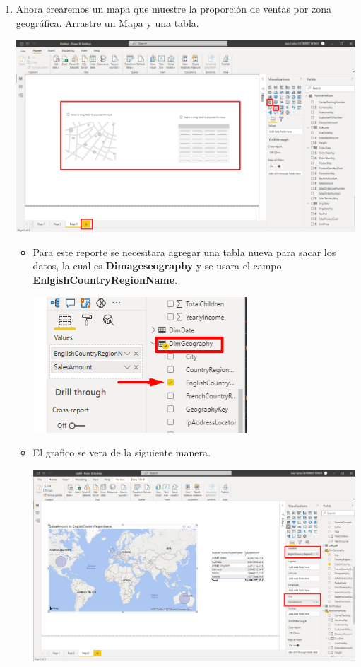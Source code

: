 \documentclass{article}
\begin{document}
\begin{enumerate}[\tab 1.]
\begin{center}
        \end{center}
        \item Ahora crearemos un mapa que muestre la proporción de ventas por zona geográfica. Arrastre un Mapa y una tabla.
        \begin{center}
            \includegraphics[width=13cm]{./images/10.png}
        \end{center}
        \begin{itemize}
        \newpage
            \item Para este reporte se necesitara agregar una tabla nueva para sacar los datos, la cual es \textbf{Dimageseography} y se usara el campo \textbf{EnlgishCountryRegionName}. 
            \begin{center}
                \includegraphics[width=8cm]{./images/10.1.png}
            \end{center}
            \item El grafico se vera de la siguiente manera.
            \begin{center}
                \includegraphics[width=13cm]{./images/10.2.png}
            \end{center}
            

\end{itemize}
\end{enumerate}
\end{document}
